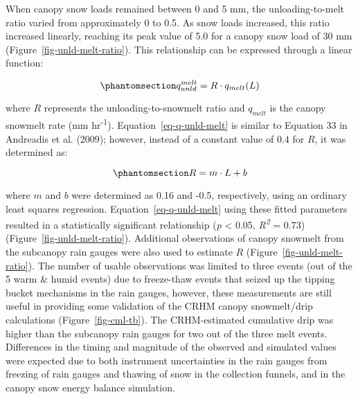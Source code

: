 \documentclass[
]{agujournal2019}
\begin{document}
When canopy snow loads remained between 0 and 5 mm, the
unloading-to-melt ratio varied from approximately 0 to 0.5. As snow
loads increased, this ratio increased linearly, reaching its peak value
of 5.0 for a canopy snow load of 30 mm
(Figure~\ref{fig-unld-melt-ratio}). This relationship can be expressed
through a linear function:

\begin{equation}\phantomsection\label{eq-q-unld-melt}{
q_{unld}^{melt} = R \cdot q_{melt}(L)
}\end{equation}

where \(R\) represents the unloading-to-snowmelt ratio and \(q_{melt}\)
is the canopy snowmelt rate (mm hr\textsuperscript{-1}).
Equation~\ref{eq-q-unld-melt} is similar to Equation 33 in Andreadis et
al. (2009); however, instead of a constant value of 0.4 for \(R\), it
was determined as:

\begin{equation}\phantomsection\label{eq-fm}{
R = m \cdot L + b
}\end{equation}

where \(m\) and \(b\) were determined as 0.16 and -0.5, respectively,
using an ordinary least squares regression.
Equation~\ref{eq-q-unld-melt} using these fitted parameters resulted in
a statistically significant relationship (\emph{p} \textless{} 0.05,
\emph{R\textsuperscript{2}} = 0.73) (Figure~\ref{fig-unld-melt-ratio}).
Additional observations of canopy snowmelt from the subcanopy rain
gauges were also used to estimate \(R\)
(Figure~\ref{fig-unld-melt-ratio}). The number of usable observations
was limited to three events (out of the 5 warm \& humid events) due to
freeze-thaw events that seized up the tipping bucket mechanisms in the
rain gauges, however, these measurements are still useful in providing
some validation of the CRHM canopy snowmelt/drip calculations
(Figure~\ref{fig-cml-tb}). The CRHM-estimated cumulative drip was higher
than the subcanopy rain gauges for two out of the three melt events.
Differences in the timing and magnitude of the observed and simulated
values were expected due to both instrument uncertainties in the rain
gauges from freezing of rain gauges and thawing of snow in the
collection funnels, and in the canopy snow energy balance simulation.
\end{document}
